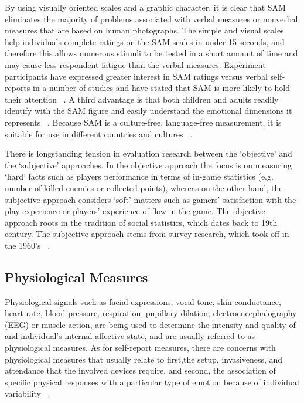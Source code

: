 By using visually oriented scales and a graphic character, it is clear that SAM eliminates the majority of problems associated with verbal measures or nonverbal measures that are based on human photographs. The simple and visual scales help individuals complete ratings on the SAM scales in under 15 seconds, and therefore this allows numerous stimuli to be tested in a short amount of time and may cause less respondent fatigue than the verbal measures. Experiment participants have expressed greater interest in SAM ratings versus verbal self-reports in a number of studies and have stated that SAM is more likely to hold their attention ~\cite{lang1985cognitive}. A third advantage is that both children and adults readily identify with the SAM figure and easily understand the emotional dimensions it represents ~\cite{lang1985cognitive}. Because SAM is a culture-free, language-free measurement, it is suitable for use in different countries and cultures ~\cite{bradley1993affective}.

There is longstanding tension in evaluation research between the `objective' and the `subjective' approaches. In the objective approach the focus is on measuring `hard' facts such as players performance in terms of in-game statistics (e.g. number of killed enemies or collected points), whereas on the other hand, the subjective approach considers `soft' matters such as gamers' satisfaction with the play experience or players' experience of flow in the game. The objective approach roots in the tradition of social statistics, which dates back to 19th century. The subjective approach stems from survey research, which took off in the 1960's ~\cite{veenhoven2002social}.

\subsection{Physiological Measures}
Physiological signals such as facial expressions, vocal tone, skin conductance, heart rate, blood pressure, respiration, pupillary dilation, electroencephalography (EEG) or muscle action, are being used to determine the intensity and quality of and individual's internal affective state, and are usually referred to as physiological measures. As for self-report measures, there are concerns with physiological measures that usually relate to first,the setup, invasiveness, and attendance that the involved devices require, and second, the association of specific physical responses with a particular type of emotion because of individual variability ~\cite{depaula2005cognitive}.

